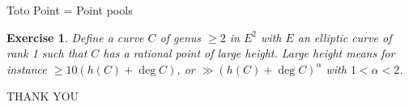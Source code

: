 \documentclass[12pt]{beamer}
\newtheorem{ex}{Exercise}
\begin{document}
\begin{comment}
	\begin{frame}{Ongoing work}
		
		\begin{tcolorbox}	
			\begin{itemize}
				
				
				\item \textcolor{red}{In relation to TASK 1} 
				
				With Lombardo and Pengo we investigate possible uniform bounds for Serre's constant.
				
				
				\pause
				
				\item  \textcolor{red}{In relation to TASK 2} 
				
				
				Work on the  Torsion Anomalous Conjecture for varieties.
				
				A part for curves and hypersurfaces and subvarieties of  codimension 2 in $E^N$ the TAC is not known.
				
				With Pengo we obtained some partial results for transverse varieties in $E^N$.
				
				
			\end{itemize}
		\end{tcolorbox}	
	\end{frame}
\end{comment}

\begin{frame}{Toto Point = Point pools}
\begin{ex}
Define a curve $C$ of genus $\ge2$ in $E^2$ with $E$ an elliptic curve of rank 1 such that $C$ has a rational point of large height.
Large height means for instance $\ge 10 ( h(C) + \deg C)$, or $\gg ( h(C) + \deg C)^\alpha$ with $1 < \alpha < 2$. 
\end{ex}
\end{frame}

\begin{frame}
\centerline{\Huge{THANK YOU}}
\end{frame}
\end{document}
